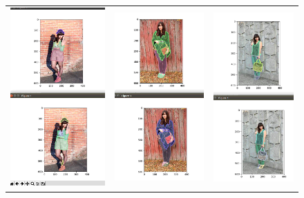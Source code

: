 \begin{figure}[H]
	\centering
	\setlength{\tabcolsep}{0.5pt}
	\setlength{\fboxsep}{0pt}%
	\setlength{\fboxrule}{0.1pt}%
	\renewcommand{\arraystretch}{0.6}
	\begin{tabular}{ccc}
		\includegraphics[width=.31\textwidth]{./figures/modanetfix/segm1} & 
		\includegraphics[width=.31\textwidth]{./figures/modanetfix/segm2} &
		\includegraphics[width=.31\textwidth]{./figures/modanetfix/segm3}\\

\end{tabular}
\end{figure}
